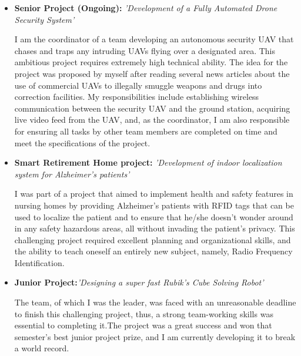 \documentclass[11pt,a4paper,sans]{moderncv}        %
\begin{document}
\begin{itemize}

\item{\textbf{Senior Project (Ongoing):} \textit{'Development of a Fully Automated Drone Security System'}

\vspace{3pt}

\small{I am the coordinator of a team developing an autonomous security UAV that chases and traps any intruding UAVs flying over a designated area. This ambitious project requires extremely high technical ability. The idea for the project was proposed by myself after reading several news articles about the use of commercial UAVs to illegally smuggle weapons and drugs into correction facilities. My responsibilities include establishing wireless communication between the security UAV and the ground station, acquiring live video feed from the UAV, and, as the coordinator, I am also responsible for ensuring all tasks by other team members are completed on time and meet the specifications of the project.}}

\vspace{6pt}

\item{\textbf{Smart Retirement Home project:} \textit{'Development of indoor localization system for Alzheimer's patients'}

\vspace{3pt}

\small{I was part of a project that aimed to implement health and safety features in nursing homes by providing Alzheimer's patients with RFID tags that can be used to localize the patient and to ensure that he/she doesn't wonder around in any safety hazardous areas, all without invading the patient's privacy. This challenging project required excellent planning and organizational skills, and the ability to teach oneself an entirely new subject, namely, Radio Frequency Identification.}}

\vspace{6pt}

\item{\textbf{Junior Project:}\textit{'Designing a super fast Rubik's Cube Solving Robot'}

\vspace{3pt}
\small{The team, of which I was the leader, was faced with an unreasonable deadline to finish this challenging project, thus, a strong team-working skills was essential to completing it.The project was a great success and won that semester's best junior project prize, and I am currently developing it to break a world record.}}


\end{itemize}
\end{document}

